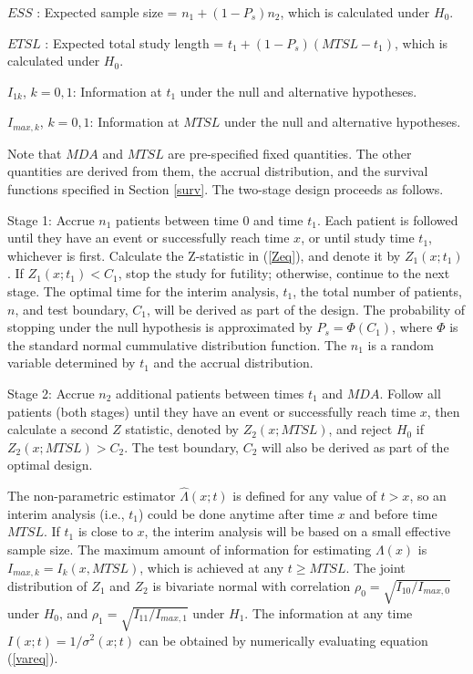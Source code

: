 \documentclass[12pt]{article}
\begin{document}
\noindent $ESS$ : Expected sample size = $n_1+(1-P_s)n_2$, which is calculated under $H_0$.

\noindent $ETSL$ : Expected total study length = $t_1+(1-P_s)(MTSL-t_1)$, which is calculated under
$H_0$.

\noindent $I_{1k}$, $k=0,1$: Information at $t_1$ under the null and alternative hypotheses.

\noindent $I_{max,k}$, $k=0,1$: Information at $MTSL$ under the null and alternative hypotheses.
\vskip12pt

\noindent Note that $MDA$ and $MTSL$ are pre-specified fixed quantities.  The other quantities are
derived from them, the accrual distribution, and the survival functions specified in Section
\ref{surv}.  The two-stage design proceeds as follows. \vskip12pt

\noindent Stage 1: Accrue $n_1$ patients between time $0$ and time $t_1$. Each patient is followed
until they have an event or successfully reach time $x$, or until study time $t_1$, whichever is
first. Calculate the Z-statistic in (\ref{Zeq}), and denote it by $Z_1(x;t_1)$. If
$Z_1(x;t_1)<C_1$, stop the study for futility; otherwise, continue to the next stage. The optimal
time for the interim analysis, $t_1$,  the total number of patients, $n$, and test boundary, $C_1$,
will be derived as part of the design.  The probability of stopping under the null hypothesis is approximated by $P_s=\Phi(C_1)$, where $\Phi$ is the standard normal cummulative distribution function.  The $n_1$ is  a random variable determined by $t_1$ and the accrual
distribution.\vskip12pt

\noindent Stage 2: Accrue $n_2$ additional patients between times $t_1$ and $MDA$. Follow all
patients (both stages) until they have an event or successfully reach time $x$, then calculate a
second $Z$ statistic, denoted by $Z_2(x;MTSL)$, and reject $H_0$ if $Z_2(x;MTSL)>C_2$.  The test
boundary, $C_2$ will also be derived as part of the optimal design. \vskip 24pt


The non-parametric estimator $\hat\Lambda(x;t)$ is defined for any value of $t>x$, so an interim
analysis (i.e., $t_1$) could be done anytime after time $x$  and before time $MTSL$.  If $t_1$ is
close to $x$, the interim analysis will be based on a small effective sample size.  The maximum amount of information
for estimating $\Lambda(x)$ is $I_{max,k}=I_k(x,MTSL)$, which is achieved at any $t\geq MTSL$. The
joint distribution of $Z_1$ and $Z_2$ is bivariate normal with correlation
$\rho_0=\sqrt{I_{10}/I_{max,0}}$ under $H_0$, and $\rho_1=\sqrt{I_{11}/I_{max,1}}$ under $H_1$. The
information at any time $I(x;t)=1/\sigma^2(x;t)$ can be obtained by numerically evaluating equation
(\ref{vareq}).
\end{document}

